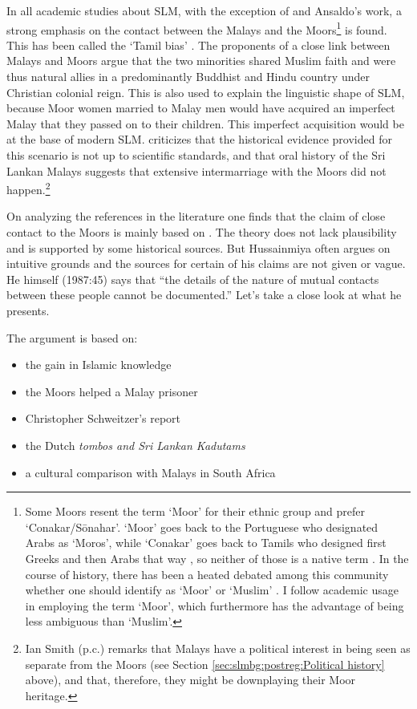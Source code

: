 In all academic studies about SLM, with the exception of
\citet{Jayasuriya2002} and Ansaldo's work, a strong emphasis on the contact between
the Malays and the Moors\footnote{Some Moors resent the term `Moor' for their ethnic group and prefer `Conakar/S\=onahar'.
 `Moor' goes back to the Portuguese who designated Arabs as `Moros', while `Conakar' goes back to Tamils who designed first Greeks and then Arabs that way \citep[2]{Hussein2007}, so neither of those is a native term \citep[45]{Nuhman2007}. In the course of history, there has been a heated debated among this community whether one should identify as `Moor' or `Muslim' \citep[42ff]{Nuhman2007}. I follow academic usage in employing the term `Moor', which furthermore has the advantage of being less ambiguous than `Muslim'.}
is found. This has been called the `Tamil bias' \citep{Ansaldo2005ms,Ansaldo2008genesis}. The proponents of a close link between Malays and Moors argue that the two minorities shared Muslim faith and were thus natural allies in a predominantly Buddhist and Hindu country under Christian colonial reign. This is also used to explain the linguistic shape of SLM,
because  Moor women married to Malay men would have acquired an
imperfect Malay that they passed on to their children. This
imperfect acquisition would be at the base of modern SLM.
\citet{Ansaldo2005ms,Ansaldo2008genesis} criticizes that the historical evidence provided for this scenario is not up to scientific standards, and that oral history of the Sri Lankan Malays suggests that extensive intermarriage with the Moors did not happen.\footnote{Ian Smith (p.c.) remarks that Malays have a political interest in being seen as separate from the Moors (see Section \ref{sec:slmbg:postreg:Political history} above), and that, therefore, they might be downplaying their Moor heritage.}

On analyzing the references in the literature one finds that the claim of close contact to the Moors is mainly based on \citet{Hussainmiya1987, Hussainmiya1990}. The theory does not lack plausibility and is supported by some historical sources. But  Hussainmiya often argues on intuitive grounds and the sources for certain of his claims are not given or vague. He himself  (1987:45) says that ``the details of the nature of mutual contacts between these people cannot be documented.'' Let's take a close look at what he presents.

The argument is based on:

\begin{itemize}
    \item the gain in Islamic knowledge
    \item the Moors helped a Malay prisoner
    \item Christopher Schweitzer's report
    \item the Dutch \em tombos \em and Sri Lankan \em Kadutams \em
    \item a cultural comparison with Malays in South Africa
\end{itemize}

